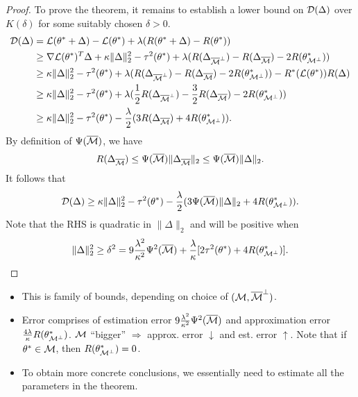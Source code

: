 \begin{proof}
To prove the theorem,
it remains to establish a lower bound
on $\mathcal{D}(\Delta)$
over $K(\delta)$ for some suitably chosen $\delta>0$.
\begin{equation}
\begin{split}
    \mathcal{D}(\Delta) & = \mathcal{L}(\theta^*+\Delta)-\mathcal{L}(\theta^*)+\lambda(R(\theta^*+\Delta)-R(\theta^*))  \\
        & \ge \nabla\mathcal{L}(\theta^*)^T\Delta + \kappa\|\Delta\|_2^2-\tau^2(\theta^*) + \lambda(R(\Delta_{{\overline{\mathcal{M}}}^\perp})-R(\Delta_{{\overline{\mathcal{M}}}})-2R(\theta^*_{\mathcal{M}^\perp})) \\
        & \ge \kappa\|\Delta\|_2^2-\tau^2(\theta^*) + \lambda(R(\Delta_{{\overline{\mathcal{M}}}^\perp})-R(\Delta_{{\overline{\mathcal{M}}}})-2R(\theta^*_{\mathcal{M}^\perp})) - R^*(\mathcal{L}(\theta^*))R(\Delta) \\
        & \ge \kappa\|\Delta\|_2^2-\tau^2(\theta^*) + \lambda(\frac{1}{2}R(\Delta_{{\overline{\mathcal{M}}}^\perp})-\frac{3}{2}R(\Delta_{{\overline{\mathcal{M}}}})-2R(\theta^*_{\mathcal{M}^\perp}))   \\
        & \ge \kappa\|\Delta\|_2^2-\tau^2(\theta^*) - \frac{\lambda}{2}(3R(\Delta_{{\overline{\mathcal{M}}}})+4R(\theta^*_{\mathcal{M}^\perp})).
\end{split}
\end{equation}
By definition of $\Psi({\overline{\mathcal{M}}})$, we have
\begin{equation}
    R(\Delta_{{\overline{\mathcal{M}}}}) \le \Psi({\overline{\mathcal{M}}})\|\Delta_{{\overline{\mathcal{M}}}}\|_2 \le \Psi({\overline{\mathcal{M}}})\|\Delta\|_2.
\end{equation}
It follows that
\begin{equation}
    \mathcal{D}(\Delta) \ge \kappa\|\Delta\|_2^2-\tau^2(\theta^*) - \frac{\lambda}{2}(3\Psi({\overline{\mathcal{M}}})\|\Delta\|_2+4R(\theta^*_{\mathcal{M}^\perp})).
\end{equation}
Note that the RHS is quadratic in $\|\Delta\|_2$ and will be positive when
\begin{equation}
    \|\Delta\|_2^2 \ge \delta^2 = 9\frac{\lambda^2}{\kappa^2}\Psi^2({\overline{\mathcal{M}}})
        + \frac{\lambda}{\kappa}[2\tau^2(\theta^*)+4R(\theta^*_{\mathcal{M}^\perp})].
\end{equation}
\end{proof}

\begin{rmk}\leavevmode
\begin{itemize}
    \item This is family of bounds, depending on choice of $(\mathcal{M}, {\overline{\mathcal{M}}}^\perp)$.
    \item Error comprises of estimation error $9\frac{\lambda^2}{\kappa^2}\Psi^2({\overline{\mathcal{M}}})$ and
        approximation error $\frac{4\lambda}{\kappa}R(\theta^*_{\mathcal{M}^\perp})$.
        $\mathcal{M}$ ``bigger'' $\Rightarrow$ approx. error $\downarrow$ and est. error $\uparrow$.
        Note that if $\theta^*\in\mathcal{M}$, then $R(\theta^*_{\mathcal{M}^\perp})=0$.
    \item To obtain more concrete conclusions, we essentially need to estimate
        all the parameters in the theorem.
\end{itemize}
\end{rmk}

